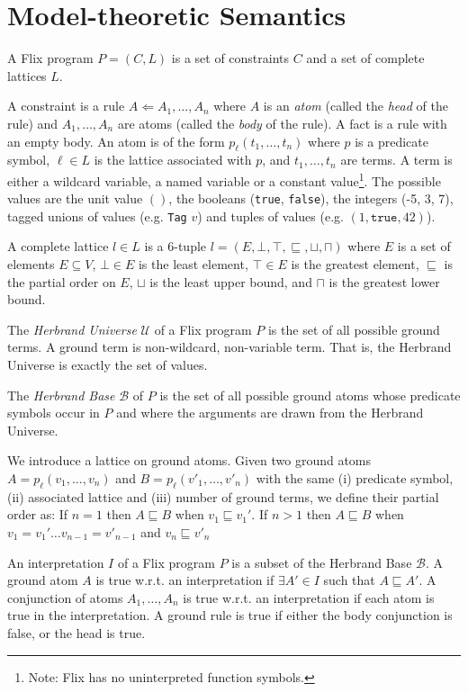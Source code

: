 \documentclass[10pt,twocolumn]{article}
\begin{document}
\section{Model-theoretic Semantics}

A Flix program $P = (C, L)$ is a set of constraints $C$ and a set of complete lattices $L$.

A constraint is a rule $A \Leftarrow A_1, \dots, A_n$ 
where $A$ is an \emph{atom} (called the \emph{head} of the rule) 
and $A_1, \dots, A_n$ are atoms (called the \emph{body} of the rule).
A fact is a rule with an empty body.
An atom is of the form $p_\ell(t_1, \dots, t_n)$ where 
$p$ is a predicate symbol,
$\ell \in L$ is the lattice associated with $p$, and
$t_1, \dots, t_n$ are terms. 
A term is either a wildcard variable, a named variable or a constant value\footnote{Note: Flix has no uninterpreted function symbols.}. 
The possible values are the unit value $()$, the booleans (\texttt{true}, \texttt{false}),
the integers (-5, 3, 7), tagged unions of values (e.g. \texttt{Tag} $v$) and 
tuples of values (e.g. $(1, \texttt{true}, 42)$).

A complete lattice $l \in L$ is a 6-tuple $l = (E, \bot, \top, \sqsubseteq, \sqcup, \sqcap)$ where 
$E$ is a set of elements $E \subseteq V$,
$\bot \in E$ is the least element,
$\top \in E$ is the greatest element,
$\sqsubseteq$ is the partial order on $E$,
$\sqcup$ is the least upper bound, and
$\sqcap$ is the greatest lower bound.

The \emph{Herbrand Universe} $\mathcal{U}$ of a Flix program $P$ is the set of all possible ground terms.
A ground term is non-wildcard, non-variable term. That is, the Herbrand Universe is exactly the set of values.

The \emph{Herbrand Base} $\mathcal{B}$ of $P$ is the set of all possible ground atoms whose
predicate symbols occur in $P$ and where the arguments are drawn from the Herbrand Universe.

We introduce a lattice on ground atoms. 
Given two ground atoms $A = p_\ell(v_1, \dots, v_n)$ and $B = p_\ell(v'_1, \dots, v'_n)$ with the same 
(i) predicate symbol, 
(ii) associated lattice and 
(iii) number of ground terms, we define their partial order as:
If $n = 1$ then $A \sqsubseteq B$ when $v_1 \sqsubseteq v_1'$.
If $n > 1$ then $A \sqsubseteq B$ when $v_1 = v_1' \dots v_{n - 1} = v'_{n - 1}$ and $v_n \sqsubseteq v'_n$

An interpretation $I$ of a Flix program $P$ is a subset of the Herbrand Base $\mathcal{B}$.
A ground atom $A$ is true w.r.t. an interpretation if $\exists A' \in I$ such that $A \sqsubseteq A'$. 
A conjunction of atoms $A_1, \dots, A_n$ is true w.r.t. an interpretation if each atom is true in the interpretation.
A ground rule is true if either the body conjunction is false, or the head is true.
\end{document}
